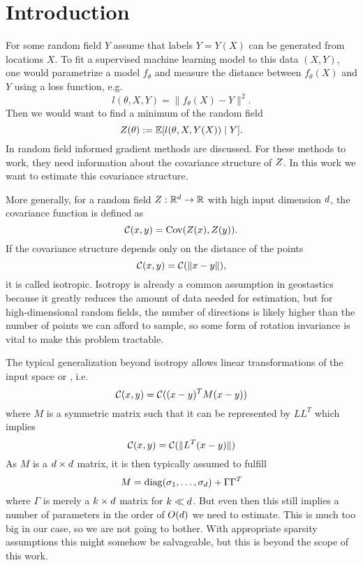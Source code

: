 \section{Introduction}

For some random field \(Y\) assume that labels \(Y=Y(X)\) can be generated
from locations \(X\). To fit a supervised machine learning model to this data
\((X,Y)\), one would parametrize a model \(f_\theta\) and measure the distance
between \(f_\theta(X)\) and \(Y\) using a loss function,
e.g.
\[
	l(\theta, X,Y) = \|f_\theta(X)-Y\|^2.
\]
Then we would want to find a minimum of the random field
\[
	Z(\theta) := \mathbb{E}[l(\theta, X,Y(X))\mid Y].
\]
In  random field informed gradient methods are discussed. For
these methods to work, they need information about the covariance structure of
\(Z\). In this work we want to estimate this covariance structure.

More generally, for a random field \(Z:\mathbb{R}^d \to \mathbb{R}\) with high
input dimension \(d\), the covariance function is defined as
\[
	\mathcal{C}(x,y) = \operatorname{Cov}(Z(x), Z(y)).
\]
If the covariance structure depends only on the distance of the points
\[
	\mathcal{C}(x,y) = \mathcal{C}(\|x-y\|),
\]
it is called isotropic. Isotropy is already a common assumption in geostastics
\parencite[e.g.][Chapter 2]{mullerCollectingSpatialData2007} because it greatly
reduces the amount of data needed for estimation, but for high-dimensional
random fields, the number of directions is likely higher than the number of
points we can afford to sample, so some form of rotation invariance is vital to
make this problem tractable.

The typical generalization beyond isotropy allows linear transformations of the
input space \parencite[e.g.][Section 5.1]{williamsGaussianProcessesMachine2006}
or \parencite{sampsonNonparametricEstimationNonstationary1992}, i.e.
\[
	\mathcal{C}(x,y) = \mathcal{C}((x-y)^T M (x-y))
\]
where \(M\) is a symmetric matrix such that it can be represented by \(LL^T\)
which implies
\[
	\mathcal{C}(x,y) = \mathcal{C}(\|L^T(x-y)\|)
\]
As \(M\) is a \(d\times d\) matrix, it is then typically
assumed to fulfill
\[
	M = \operatorname{diag}(\sigma_1,\dots,\sigma_d) + \Gamma\Gamma^T
\]
where \(\Gamma\) is merely a \(k\times d\) matrix for \(k\ll d\).
But even then this still implies a number of parameters in the order of
\(O(d)\) we need to estimate. This is much too big in our case, so we
are not going to bother. With appropriate sparsity assumptions this might
somehow be salvageable, but this is beyond the scope of this work.

